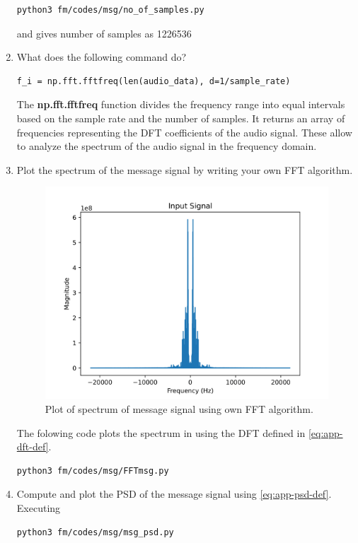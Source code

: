 \begin{enumerate}[label=\arabic*.,ref=\thesection.\theenumi]
\begin{lstlisting}
python3 fm/codes/msg/no_of_samples.py
\end{lstlisting}
and gives number of samples as 1226536
\item What does the following command do?
\begin{lstlisting}
f_i = np.fft.fftfreq(len(audio_data), d=1/sample_rate)
\end{lstlisting}
The \textbf{np.fft.fftfreq} function divides the frequency range into equal intervals based on the sample rate and the number of samples. It returns an array of frequencies representing the DFT coefficients of the audio signal. These allow to analyze the spectrum of the audio signal in the frequency domain.
\item Plot the spectrum of the message signal by writing your own FFT algorithm.\\
	\solution
\begin{figure}[H]
\centering
\includegraphics[width=\columnwidth]{fm/msg/figs/FFTown/input2.png}
\caption{Plot of spectrum of message signal using own FFT algorithm.}
\label{fig:FFTo}
\end{figure}
The folowing code plots the spectrum in  using the DFT defined in  \eqref{eq:app-dft-def}.
\begin{lstlisting}
python3 fm/codes/msg/FFTmsg.py
\end{lstlisting}
\item Compute and plot the PSD of the message signal using 
\eqref{eq:app-psd-def}.
\\
	\solution
Executing	
\begin{lstlisting}
python3 fm/codes/msg/msg_psd.py
\end{lstlisting}


\end{enumerate}
